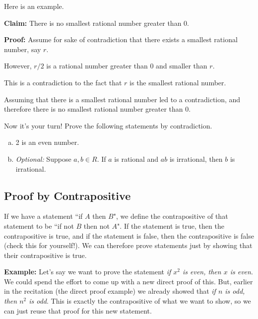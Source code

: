 \documentclass[12pt,letterpaper]{article}
\begin{document}
      Here is an example.

      \textbf{Claim:}  There is no smallest rational number greater than 0.

      \textbf{Proof:} Assume for sake of contradiction that there exists a smallest rational number, say $r$.
      
      However, $r/2$ is a rational number greater than $0$ and smaller than $r$.
      
      This is a contradiction to the fact that $r$ is the smallest rational number.
      
      Assuming that there is a smallest rational number led to a contradiction, and therefore there is no smallest rational number greater than $0$.
      
      Now it's your turn! Prove the following statements by contradiction. 
      
      \begin{enumerate}[a.]

        \item 2 is an even number.

        \begin{mdframed} \vspace{2cm} \end{mdframed}
        
        \item \textit{Optional:} Suppose $a,b \in R$. If $a$ is rational and $ab$ is irrational, then $b$ is irrational.
        
        \begin{mdframed} \vspace{2cm} \end{mdframed}
        
      \end{enumerate}
		
	\subsection*{Proof by Contrapositive}
	If we have a statement ``if $A$ then $B$", we define the contrapositive of that statement to be ``if not $B$ then not $A$". If the statement is true, then the contrapositive is true, and if the statement is false, then the contrapositive is false (check this for yourself!). We can therefore prove statements just by showing that their contrapositive is true.
	
	\textbf{Example:} Let's say we want to prove the statement \textit{if $x^2$ is even, then $x$ is even}. We could spend the effort to come up with a new direct proof of this. But, earlier in the recitation (the direct proof example) we already showed that \textit{if $n$ is odd, then $n^2$ is odd}. This is exactly the contrapositive of what we want to show, so we can just reuse that proof for this new statement.
	
\end{document}

